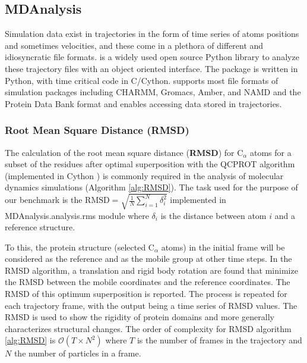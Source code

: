 \label{use_cases}

\subsection{MDAnalysis}
\label{sec:mda}

Simulation data exist in trajectories in the form of time series of atoms positions and sometimes velocities, and these come in a plethora of different and idiosyncratic file formats. 
 \citep{Gowers:2016aa,Michaud-Agrawal:2011fu} is a widely used open source Python library to analyze these trajectory files with an object oriented interface. 
The package is written in Python, with time critical code in C/Cython. 
 supports most file formats of simulation packages including CHARMM, Gromacs, Amber, and NAMD and the Protein Data Bank format and enables accessing data stored in trajectories. 
 
\subsubsection{Root Mean Square Distance (RMSD)}
The calculation of the root mean square distance (\textbf{RMSD}) for C$_{\alpha}$ atoms for a subset of the residues after 
optimal superposition with the QCPROT algorithm \cite{Liu:2010kx,Theobald:2005vn} (implemented in Cython \cite{Gowers:2016aa}) is commonly required in the analysis of molecular dynamics simulations (Algorithm \ref{alg:RMSD}). 
The task used for the purpose of our benchmark is the $\text{RMSD}=\sqrt{\frac{1}{N}\sum_{i=1}^{N}\delta_{i}^{2}}$ implemented in MDAnalysis.analysis.rms module where $\delta_{i}$ is the distance between atom $i$ and a reference structure.  

To this, the protein structure (selected C$_{\alpha}$ atoms) in the initial frame will be considered as the reference and as the mobile group at other time steps. 
In the RMSD algorithm, a translation and rigid body rotation are found that minimize the RMSD between the mobile coordinates and the reference coordinates. 
The RMSD of this optimum superposition is reported. 
The process is repeated for each trajectory frame, with the output being a time series of RMSD values.
The RMSD is used to show the rigidity of protein domains and more generally characterizes structural changes.
The order of complexity for RMSD algorithm \ref{alg:RMSD} is $\mathcal{O}(T \times N^{2})$ \cite{Liu:2010kx} where $T$ is the number of frames in the trajectory and $N$ the number of particles in a frame.

